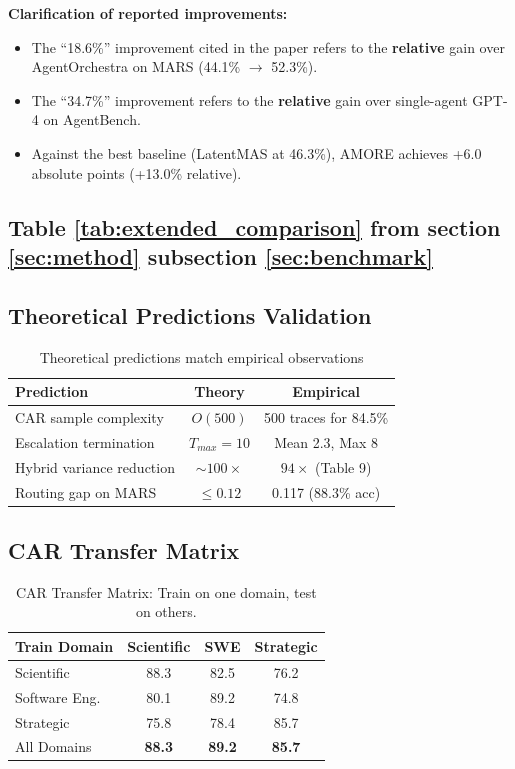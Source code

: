 \documentclass{article}
\theoremstyle{plain}
\theoremstyle{definition}
\theoremstyle{remark}
\begin{document}
\textbf{Clarification of reported improvements:}
\begin{itemize}[nosep,leftmargin=*]
\item The ``18.6\%'' improvement cited in the paper refers to the \textbf{relative} gain over AgentOrchestra on MARS (44.1\% $\rightarrow$ 52.3\%).
\item The ``34.7\%'' improvement refers to the \textbf{relative} gain over single-agent GPT-4 on AgentBench.
\item Against the best baseline (LatentMAS at 46.3\%), AMORE achieves +6.0 absolute points (+13.0\% relative).
\end{itemize}

\subsection{Table \ref{tab:extended_comparison} from section \ref{sec:method} subsection \ref{sec:benchmark}}

\subsection{Theoretical Predictions Validation}
\begin{table}[h]
	\centering
	\small
	\caption{Theoretical predictions match empirical observations}
	\label{tab:theory_validation}
	\begin{tabular}{lcc}
		\toprule
		\textbf{Prediction} & \textbf{Theory} & \textbf{Empirical} \\
		\midrule
		CAR sample complexity & $O(500)$ & 500 traces for 84.5\% \\
		Escalation termination & $T_{max} = 10$ & Mean 2.3, Max 8 \\
		Hybrid variance reduction & $\sim 100\times$ & $94\times$ (Table 9) \\
		Routing gap on MARS & $\leq 0.12$ & 0.117 (88.3\% acc) \\
		\bottomrule
	\end{tabular}
\end{table}

\subsection{CAR Transfer Matrix}
\begin{table}[h]
	\caption{CAR Transfer Matrix: Train on one domain, test on others.}
	\label{tab:car_transfer}
	\centering
	\small
	\begin{tabular}{@{}lccc@{}}
		\toprule
		\textbf{Train Domain} & \textbf{Scientific} & \textbf{SWE} & \textbf{Strategic} \\
		\midrule
		Scientific & 88.3 & 82.5 & 76.2 \\
		Software Eng. & 80.1 & 89.2 & 74.8 \\
		Strategic & 75.8 & 78.4 & 85.7 \\
		All Domains & \textbf{88.3} & \textbf{89.2} & \textbf{85.7} \\
		\bottomrule
	\end{tabular}
\end{table}
\end{document}
